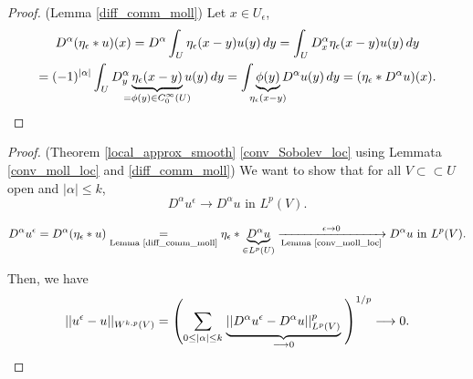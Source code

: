 \documentclass[12pt]{article}
\theoremstyle{definition}
\begin{document}
\begin{proof}
(Lemma \ref{diff_comm_moll}) Let $x\in U_{\epsilon}$,
\begin{multline*}
D^{\alpha}(\eta_{\epsilon}*u)(x)=D^{\alpha}\int_U\eta_{\epsilon}(x-y)u(y)\,dy=\int_UD_x^{\alpha}\eta_{\epsilon}(x-y)u(y)\,dy\\
=(-1)^{|\alpha|}\int_UD_y^{\alpha}\underbrace{\eta_{\epsilon}(x-y)}_{\mathclap{=\phi(y)\in C_0^{\infty}(U)}}u(y)\,dy=\int\underbrace{\phi(y)}_{\mathclap{\eta_{\epsilon}(x-y)}}D^{\alpha}u(y)\,dy=(\eta_{\epsilon}*D^{\alpha}u)(x).
\end{multline*}
\end{proof}

\begin{proof}
(Theorem \ref{local_approx_smooth} \ref{conv_Sobolev_loc} using Lemmata \ref{conv_moll_loc} and \ref{diff_comm_moll}) We want to show that for all $V\subset\subset U$ open and $|\alpha|\leq k$,
\[D^{\alpha}u^{\epsilon}\longrightarrow D^{\alpha}u\text{ in }L^p(V).\]

\[D^{\alpha}u^{\epsilon}=D^{\alpha}(\eta_{\epsilon}*u)\underset{\text{Lemma \ref{diff_comm_moll}}}{=}\eta_{\epsilon}*\underbrace{D^{\alpha}u}_{\in L^p(U)}\xrightarrow[\text{Lemma \ref{conv_moll_loc}}]{\epsilon\to0}D^{\alpha}u\text{ in }L^p(V).\]

Then, we have
\[||u^{\epsilon}-u||_{W^{k,p}(V)}=\left(\sum_{0\leq|\alpha|\leq k}\right.\underbrace{||D^{\alpha}u^{\epsilon}-D^{\alpha}u||_{L^p(V)}^p}_{\longrightarrow0}\left.\vphantom{\sum_{0\leq|\alpha|\leq k}}\right)^{1/p}\longrightarrow0.\]
\end{proof}
\end{document}
